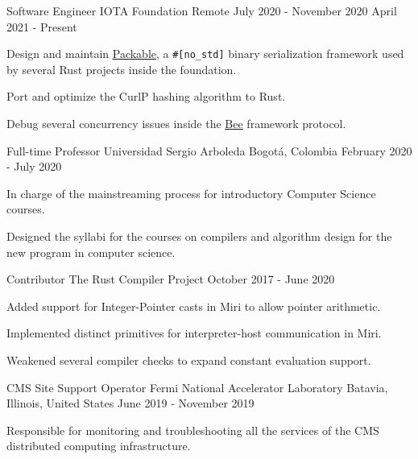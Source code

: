 


\begin{cventries}
    \cventry
    {Software Engineer}
    {IOTA Foundation}
    {Remote}
    {July 2020 - November 2020 \linebreak April 2021 - Present}
    {
        \begin{cvitems}
        \item Design and maintain \href{https://crates.io/crates/packable}{\underline{Packable}}, a \texttt{\#[no\_std]} binary serialization framework used by several Rust projects inside the foundation.
        \item Port and optimize the CurlP hashing algorithm to Rust.
        \item Debug several concurrency issues inside the \href{https://github.com/iotaledger/bee/}{\underline{Bee}} framework protocol.
        \end{cvitems}
    }
    \cventry
    {Full-time Professor}
    {Universidad Sergio Arboleda}
    {Bogotá, Colombia}
    {February 2020 - July 2020}
    {
        \begin{cvitems}
        \item In charge of the mainstreaming process for introductory Computer Science courses.
        \item Designed the syllabi for the courses on compilers and algorithm design for the new program in computer science.
        \end{cvitems}
    }
    \cventry
    {Contributor}
    {The Rust Compiler Project}
    {}
    {October 2017 - June 2020}
    {
        \begin{cvitems}
        \item Added support for Integer-Pointer casts in Miri to allow pointer arithmetic.
        \item Implemented distinct primitives for interpreter-host communication in Miri.
        \item Weakened several compiler checks to expand constant evaluation support.
        \end{cvitems}
    }
    \cventry
    {CMS Site Support Operator}
    {Fermi National Accelerator Laboratory}
    {Batavia, Illinois, United States}
    {June 2019 - November 2019}
    {
        \begin{cvitems}
        \item{Responsible for monitoring and troubleshooting all the services of the CMS distributed computing infrastructure.}
        \end{cvitems}
    }


\end{cventries}
